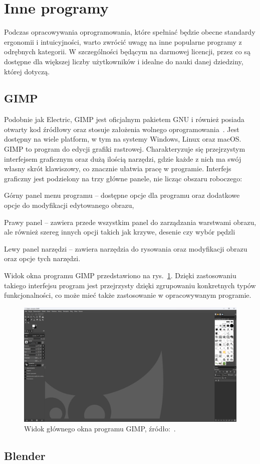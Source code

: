 \section{Inne programy}
\label{sec:inne_programy}

Podczas opracowywania oprogramowania,
które spełniać będzie obecne standardy ergonomii i intuicyjności,
warto zwrócić uwagę na inne popularne programy z odrębnych kategorii.
W szczególności będącym na darmowej licencji,
przez co są dostępne dla większej liczby użytkowników
i idealne do nauki danej dziedziny, której dotyczą.

\subsection{GIMP}

Podobnie jak Electric, GIMP jest oficjalnym pakietem GNU i również posiada otwarty kod źródłowy
oraz stosuje założenia wolnego oprogramowania~\cite{gimp_site}.
Jest dostępny na wiele platform, w tym na systemy Windows, Linux oraz macOS.
GIMP to program do edycji grafiki rastrowej.
Charakteryzuje się przejrzystym interfejsem graficznym oraz dużą ilością narzędzi,
gdzie każde z nich ma swój własny skrót klawiszowy, co znacznie ułatwia pracę w programie.
\indent Interfejs graficzny jest podzielony na trzy główne panele, nie licząc obszaru roboczego:

\begin{citemize}
    \item Górny panel menu programu -- dostępne opcje dla programu oraz dodatkowe opcje do modyfikacji edytowanego obrazu,
    \item Prawy panel -- zawiera przede wszystkim panel do zarządzania warstwami obrazu,
    ale również szereg innych opcji takich jak krzywe, desenie czy wybór pędzli
    \item Lewy panel narzędzi -- zawiera narzędzia do rysowania oraz modyfikacji obrazu oraz opcje tych narzędzi.
\end{citemize}

Widok okna programu GIMP przedstawiono na rys.~\ref{fig:gimp_okno}.
Dzięki zastosowaniu takiego interfejsu program jest przejrzysty dzięki zgrupowaniu konkretnych typów funkcjonalności,
co może mieć także zastosowanie w opracowywanym programie.

\begin{figure}[h]
    \centering
    \includegraphics[width=.9\textwidth]{chapters/chapter2/img/gimp}
    \caption[Widok głównego okna programu GIMP.]{Widok głównego okna programu GIMP, źródło:~\cite{gimp_site}.}
    \label{fig:gimp_okno}
\end{figure}

\subsection{Blender}
